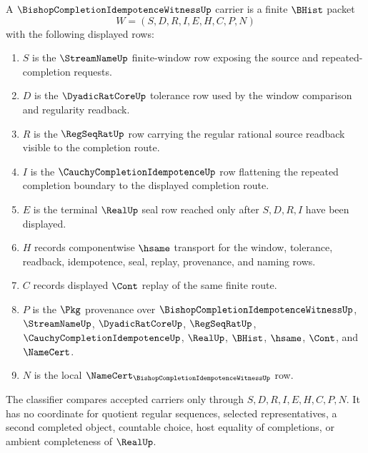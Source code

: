 \begin{definition}
\label{def:bishop-completion-idempotence-witness-carrier}
A $\BishopCompletionIdempotenceWitnessUp$ carrier is a finite $\BHist$ packet
$$
W=(S,D,R,I,E,H,C,P,N)
$$
with the following displayed rows:
\begin{enumerate}
\item $S$ is the $\StreamNameUp$ finite-window row exposing the source and repeated-completion requests.
\item $D$ is the $\DyadicRatCoreUp$ tolerance row used by the window comparison and regularity readback.
\item $R$ is the $\RegSeqRatUp$ row carrying the regular rational source readback visible to the completion route.
\item $I$ is the $\CauchyCompletionIdempotenceUp$ row flattening the repeated completion boundary to the displayed completion route.
\item $E$ is the terminal $\RealUp$ seal row reached only after $S,D,R,I$ have been displayed.
\item $H$ records componentwise $\hsame$ transport for the window, tolerance, readback, idempotence, seal, replay, provenance, and naming rows.
\item $C$ records displayed $\Cont$ replay of the same finite route.
\item $P$ is the $\Pkg$ provenance over $\BishopCompletionIdempotenceWitnessUp$, $\StreamNameUp$, $\DyadicRatCoreUp$, $\RegSeqRatUp$, $\CauchyCompletionIdempotenceUp$, $\RealUp$, $\BHist$, $\hsame$, $\Cont$, and $\NameCert$.
\item $N$ is the local $\NameCert_{\BishopCompletionIdempotenceWitnessUp}$ row.
\end{enumerate}
The classifier compares accepted carriers only through $S,D,R,I,E,H,C,P,N$. It has no coordinate for quotient regular sequences, selected representatives, a second completed object, countable choice, host equality of completions, or ambient completeness of $\RealUp$.
\end{definition}

